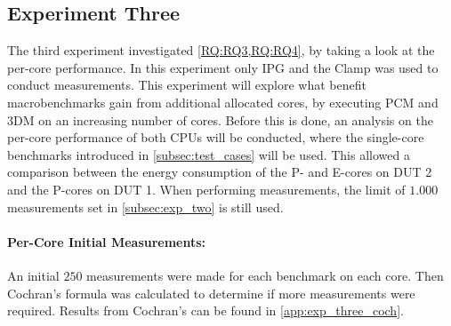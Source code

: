 \subsection{Experiment Three}\label{subsec:exp_three}

The third experiment investigated \cref{RQ:RQ3,RQ:RQ4}, by taking a look at the per-core performance. In this experiment only IPG and the Clamp was used to conduct measurements. This experiment will explore what benefit macrobenchmarks gain from additional allocated cores, by executing PCM and 3DM on an increasing number of cores. Before this is done, an analysis on the per-core performance of both CPUs will be conducted, where the single-core benchmarks introduced in \cref{subsec:test_cases} will be used. This allowed a comparison between the energy consumption of the P- and E-cores on DUT 2 and the P-cores on DUT 1. When performing measurements, the limit of $1.000$ measurements set in \cref{subsec:exp_two} is still used.


\paragraph{Per-Core Initial Measurements:} An initial $250$ measurements were made for each benchmark on each core. Then Cochran's formula was calculated to determine if more measurements were required. Results from Cochran's can be found in \cref{app:exp_three_coch}.




